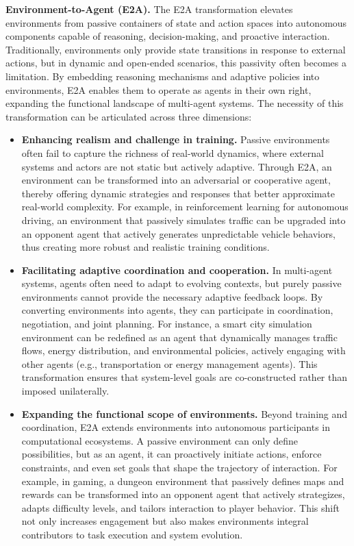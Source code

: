 \documentclass[11pt]{article}
\begin{document}
\textbf{Environment-to-Agent (E2A).} The E2A transformation elevates environments from passive containers of state and action spaces into autonomous components capable of reasoning, decision-making, and proactive interaction. Traditionally, environments only provide state transitions in response to external actions, but in dynamic and open-ended scenarios, this passivity often becomes a limitation. By embedding reasoning mechanisms and adaptive policies into environments, E2A enables them to operate as agents in their own right, expanding the functional landscape of multi-agent systems. The necessity of this transformation can be articulated across three dimensions:  

\begin{itemize}[leftmargin=*,itemsep=0.1em]
  \item \textbf{Enhancing realism and challenge in training.}  
  Passive environments often fail to capture the richness of real-world dynamics, where external systems and actors are not static but actively adaptive. Through E2A, an environment can be transformed into an adversarial or cooperative agent, thereby offering dynamic strategies and responses that better approximate real-world complexity. For example, in reinforcement learning for autonomous driving, an environment that passively simulates traffic can be upgraded into an opponent agent that actively generates unpredictable vehicle behaviors, thus creating more robust and realistic training conditions.  

  \item \textbf{Facilitating adaptive coordination and cooperation.}  
  In multi-agent systems, agents often need to adapt to evolving contexts, but purely passive environments cannot provide the necessary adaptive feedback loops. By converting environments into agents, they can participate in coordination, negotiation, and joint planning. For instance, a smart city simulation environment can be redefined as an agent that dynamically manages traffic flows, energy distribution, and environmental policies, actively engaging with other agents (e.g., transportation or energy management agents). This transformation ensures that system-level goals are co-constructed rather than imposed unilaterally.  

  \item \textbf{Expanding the functional scope of environments.}  
  Beyond training and coordination, E2A extends environments into autonomous participants in computational ecosystems. A passive environment can only define possibilities, but as an agent, it can proactively initiate actions, enforce constraints, and even set goals that shape the trajectory of interaction. For example, in gaming, a dungeon environment that passively defines maps and rewards can be transformed into an opponent agent that actively strategizes, adapts difficulty levels, and tailors interaction to player behavior. This shift not only increases engagement but also makes environments integral contributors to task execution and system evolution.  
\end{itemize}
\end{document}
